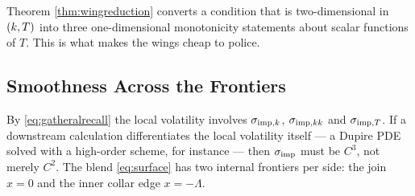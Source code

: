 Theorem \ref{thm:wingreduction} converts a condition that is two-dimensional in $(k,T)$ into
three one-dimensional monotonicity statements about scalar functions of $T$. This is what makes the
wings cheap to police. 





\subsection{Smoothness Across the Frontiers}
\label{subsec:smoothness}

By \eqref{eq:gatheralrecall} the local volatility involves $\sigma_{\mathrm{imp},k}$, $\sigma_{\mathrm{imp},kk}$ and $\sigma_{\mathrm{imp},T}$. If a
downstream calculation differentiates the local volatility itself --- a Dupire PDE solved with a
high-order scheme, for instance --- then $\sigma_{\mathrm{imp}}$ must be $C^{3}$, not merely $C^{2}$. The blend
\eqref{eq:surface} has two internal frontiers per side: the join $x=0$ and the inner collar edge
$x=-\Lambda$.

